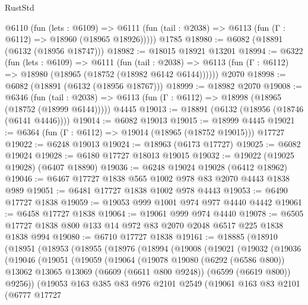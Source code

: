 \begin{lexlean}{RustStd}
\begin{coremodule}
    @6110
      (fun (lets : @6109) =>
      @6111 (fun (tail : @2038) => @6113 (fun (Γ : @6112) => @18960 (@18965 @18926)))))
    @1785
@18980 := @6082 (@18891 (@6132 (@18956 @18747)))
@18982 := @18015 @18921 @13201
@18994 := @6322
    (fun (lets : @6109) =>
    @6111
      (fun (tail : @2038) =>
      @6113 (fun (Γ : @6112) => @18980 (@18965 (@18752 (@18982 @6142 @6144))))))
    @2070
@18998 := @6082 (@18891 (@6132 (@18956 @18767)))
@18999 := @18982 @2070
@19008 := @6346
    (fun (tail : @2038) => @6113 (fun (Γ : @6112) => @18998 (@18965 (@18752 (@18999 @6144)))))
    @4445
@19013 := @18891 (@6132 (@18956 (@18746 (@6141 @4446))))
@19014 := @6082 @19013
@19015 := @18999 @4445
@19021 := @6364 (fun (Γ : @6112) => @19014 (@18965 (@18752 @19015))) @17727
@19022 := @6248 @19013
@19024 := @18963 (@6173 @17727)
@19025 := @6082 @19024
@19028 := @6180 @17727 @18013 @19015
@19032 := @19022 (@19025 @19028) (@6407 @18890)
@19036 := @6248 @19024 @19028 (@6412 @18962)
@19046 := @6467 @17727 @1838 @565 @1002 @978 @83 @2070 @4443 @1838 @989
@19051 := @6481 @17727 @1838 @1002 @978 @4443
@19053 := @6490 @17727 @1838
@19059 := @19053 @999 @1001 @974 @977 @4440 @4442
@19061 := @6458 @17727 @1838
@19064 := @19061 @999 @974 @4440
@19078 := @6505 @17727 @1838 @800 @133 @14 @972 @83 @2070 @2048 @6517 @225 @1838 @1838 @994
@19080 := @6710 @17727 @1838
@19161 := @18885
    (@18910
      (@18951
        (@18953
          (@18955
            (@18976
              (@18994
                (@19008
                  (@19021
                    (@19032
                      (@19036
                        (@19046
                          (@19051
                            (@19059
                              (@19064
                                (@19078
                                  @19080
                                  (@6292 (@6586 @800))
                                  @13062
                                  @13065
                                  @13069
                                  (@6609 (@6611 @800 @9248))
                                  (@6599 (@6619 @800))
                                  @9256))
                              (@19053
                                @163
                                @385
                                @83
                                @976
                                @2101
                                @2549
                                (@19061
                                  @163
                                  @83
                                  @2101
                                  (@6777
                                    @17727

\end{coremodule}
\end{lexlean}
